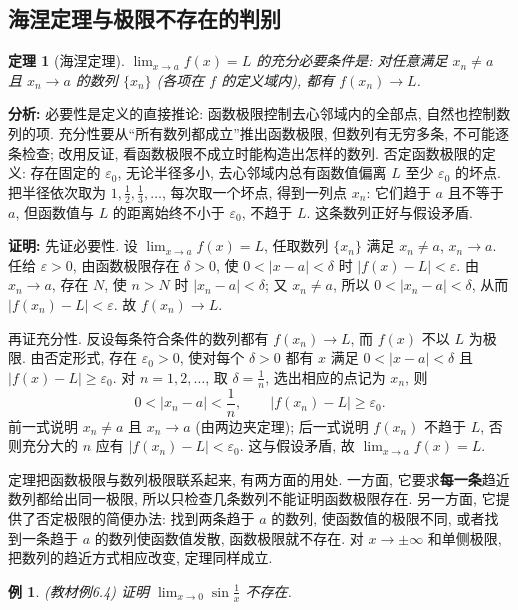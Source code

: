 \documentclass[UTF8,openany]{ctexbook}
\theoremstyle{chinesetextbook}
\newtheorem{example}{例}[section]
\newtheorem{theorem}{定理}[section]
\newenvironment{cnproof}{\par\indent\textbf{证明:} \ignorespaces}{\par}
\begin{document}
\subsection{海涅定理与极限不存在的判别}
\begin{theorem}[海涅定理]
$\displaystyle \lim_{x\to a}f(x)=L$ 的充分必要条件是: 对任意满足 $x_n\ne a$ 且 $x_n\to a$ 的数列 $\{x_n\}$ (各项在 $f$ 的定义域内), 都有 $f(x_n)\to L$.
\end{theorem}
\par\indent\textbf{分析:} 必要性是定义的直接推论: 函数极限控制去心邻域内的全部点, 自然也控制数列的项. 充分性要从“所有数列都成立”推出函数极限, 但数列有无穷多条, 不可能逐条检查; 改用反证, 看函数极限不成立时能构造出怎样的数列. 否定函数极限的定义: 存在固定的 $\varepsilon_0$, 无论半径多小, 去心邻域内总有函数值偏离 $L$ 至少 $\varepsilon_0$ 的坏点. 把半径依次取为 $\displaystyle1,\frac12,\frac13,\ldots$, 每次取一个坏点, 得到一列点 $x_n$: 它们趋于 $a$ 且不等于 $a$, 但函数值与 $L$ 的距离始终不小于 $\varepsilon_0$, 不趋于 $L$. 这条数列正好与假设矛盾.
\begin{cnproof}
先证必要性. 设 $\displaystyle\lim_{x\to a}f(x)=L$, 任取数列 $\{x_n\}$ 满足 $x_n\ne a$, $x_n\to a$. 任给 $\varepsilon>0$, 由函数极限存在 $\delta>0$, 使 $0<|x-a|<\delta$ 时 $|f(x)-L|<\varepsilon$. 由 $x_n\to a$, 存在 $N$, 使 $n>N$ 时 $|x_n-a|<\delta$; 又 $x_n\ne a$, 所以 $0<|x_n-a|<\delta$, 从而 $|f(x_n)-L|<\varepsilon$. 故 $f(x_n)\to L$.

再证充分性. 反设每条符合条件的数列都有 $f(x_n)\to L$, 而 $f(x)$ 不以 $L$ 为极限. 由否定形式, 存在 $\varepsilon_0>0$, 使对每个 $\delta>0$ 都有 $x$ 满足 $0<|x-a|<\delta$ 且 $|f(x)-L|\ge\varepsilon_0$. 对 $n=1,2,\ldots$, 取 $\displaystyle\delta=\frac1n$, 选出相应的点记为 $x_n$, 则
\[
0<|x_n-a|<\frac1n,\qquad |f(x_n)-L|\ge\varepsilon_0.
\]
前一式说明 $x_n\ne a$ 且 $x_n\to a$ (由两边夹定理); 后一式说明 $f(x_n)$ 不趋于 $L$, 否则充分大的 $n$ 应有 $|f(x_n)-L|<\varepsilon_0$. 这与假设矛盾, 故 $\displaystyle\lim_{x\to a}f(x)=L$.
\end{cnproof}
定理把函数极限与数列极限联系起来, 有两方面的用处. 一方面, 它要求\textbf{每一条}趋近数列都给出同一极限, 所以只检查几条数列不能证明函数极限存在. 另一方面, 它提供了否定极限的简便办法: 找到两条趋于 $a$ 的数列, 使函数值的极限不同, 或者找到一条趋于 $a$ 的数列使函数值发散, 函数极限就不存在. 对 $x\to\pm\infty$ 和单侧极限, 把数列的趋近方式相应改变, 定理同样成立.
\begin{example}
\textnormal{(教材例6.4)} 证明 $\displaystyle \lim_{x\to0}\sin\frac1x$ 不存在.
\end{example}
\end{document}

